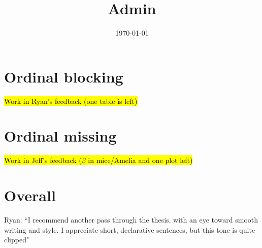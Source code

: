 \documentclass[12pt]{article}
\title{Admin}
\date{\today}
\begin{document}
\maketitle

\section*{Ordinal blocking}
	\begin{coi}
		\item \hl{Work in Ryan's feedback (one table is left)}
	\end{coi}
	
\section*{Ordinal missing}
	\begin{coi}
		\item \hl{Work in Jeff's feedback ($\beta$ in mice/Amelia and one plot left)}
	\end{coi}
		
\section*{Overall}
	\begin{coi}
		\item Ryan: ``I recommend another pass through the thesis, with an eye toward smooth writing and style. I appreciate short, declarative sentences, but this tone is quite clipped"
	\end{coi}	
\end{document}
